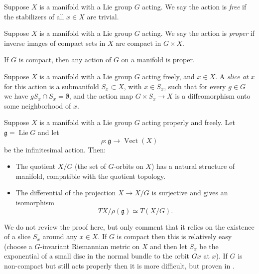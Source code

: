 \documentclass[12pt,letterpaper,reqno]{article}
\numberwithin{equation}{section}
\newcommand{\fg}{{\mathfrak g}}
\newcommand{\ti}[1]{\textit{#1}}
\DeclareMathOperator{\Lie}{Lie}
\DeclareMathOperator{\Vect}{Vect}
\newcommand{\insfig}[2]{

\medskip
\noindent
\begin{minipage}{\linewidth}

\makebox[\linewidth]{\texttt{[image: figures/\#1-crop.pdf]}}

\end{minipage}
\medskip

}
\begin{document}
\begin{defn} \label{def:free} Suppose $X$ is a manifold
with a Lie group $G$ acting. We say the action is \ti{free} if
the stabilizers of all $x \in X$ are trivial.
\end{defn}

\begin{defn} \label{def:proper}
Suppose $X$ is a manifold
with a Lie group $G$ acting. We say the action is \ti{proper} if
inverse images of compact sets in $X$
are compact in $G \times X$.
\end{defn}

\begin{prop}
If $G$ is compact, then any action of $G$ on a manifold is proper.
\end{prop}

\begin{defn}[Slice] \label{def:slice}
Suppose $X$ is a manifold with a Lie group $G$ acting freely,
and $x \in X$.
A \ti{slice at $x$} for this action is a
submanifold $S_x \subset X$, with $x \in S_x$,
such that for every $g \in G$ we have $g S_x \cap S_x = \emptyset$,
and the action map $G \times S_x \to X$ is a diffeomorphism
onto some neighborhood of $x$.
\end{defn}

\insfig{higgs-bundles-10}{1.1}

\begin{prop} \label{prop:free-proper-quotients-are-manifolds}
Suppose $X$ is a manifold with a Lie group $G$
acting properly and freely.
Let $\fg = \Lie G$ and let
\begin{equation}
\rho: \fg \to \Vect(X)
\end{equation}
be the infinitesimal action.
Then:
\begin{itemize}
\item The quotient $X / G$ (the set of $G$-orbits on $X$)
has a natural structure of manifold, compatible with
the quotient topology.
\item The differential of the projection $X \to X/G$
is surjective and gives an isomorphism
\begin{equation}
TX / \rho(\fg) \simeq T(X/G).
\end{equation}
\end{itemize}
\end{prop}

We do not review the proof here, but only comment that it
relies on the existence of a slice $S_x$ around any $x \in X$.
If $G$ is compact then this is relatively easy (choose a
$G$-invariant Riemannian metric on $X$ and then
let $S_x$ be the exponential of a small disc in the normal bundle
to the orbit $Gx$ at $x$). If $G$ is non-compact but still acts properly
then it is more difficult, but proven in \cite{MR0126506}.
\end{document}
